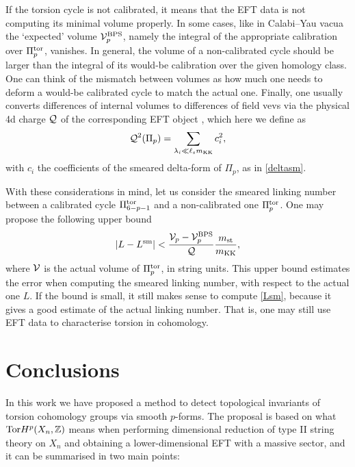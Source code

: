 \documentclass[11pt]{article}
\def\be{\begin{equation}}
\def\ee{\end{equation}}
\newcommand{\IZ}{\mathbb{Z}}
\begin{document}
If the torsion cycle is not calibrated, it means that the EFT data is not computing its minimal volume properly. In some cases, like in Calabi--Yau vacua the `expected' volume ${\cal V}_p^{\rm BPS}$, namely the integral of the appropriate calibration over $\Pi_p^{\rm tor}$,  vanishes. In general, the volume of a non-calibrated cycle should be larger than the integral of its would-be calibration over the given homology class. One can think of the mismatch between volumes as how much one needs to deform a would-be calibrated cycle to match the actual one. Finally, one usually converts differences of internal volumes to differences of field vevs via the physical 4d charge ${\cal Q}$ of the corresponding EFT object  \cite{Lanza:2021udy}, which here we define as 
\be
{\cal Q}^2(\Pi_p) = \sum_{\lambda_i \ll \ell_s m_{\rm KK}} c_i^2 ,
\label{physQ}
\ee
with $c_i$ the coefficients of the smeared delta-form of $\Pi_p$, as in \eqref{deltasm}.  

With these considerations in mind, let us consider the smeared linking number between a calibrated cycle $\Pi_{6-p-1}^{\rm tor}$ and a non-calibrated one $\Pi_p^{\rm tor}$. One may propose the following upper bound 
\be
\left| L- L^{\rm sm} \right| < \frac{{\cal V}
_p - {\cal V}_{p}^{\rm BPS}}{{\cal Q}} \frac{m_{\rm st}}{m_{\rm KK}} ,
\ee
where ${\cal V}$ is the actual volume of $\Pi_p^{\rm tor}$, in string units. This upper bound estimates the error when computing the smeared linking number, with respect to the actual one $L$. If the bound is small, it still makes sense to compute \eqref{Lsm}, because it gives a good estimate of the actual linking number. That is, one may still use EFT data to characterise torsion in cohomology.



\section{Conclusions}
\label{s:conclu}

In this work we have proposed a method to detect topological invariants of torsion cohomology groups via smooth $p$-forms. The proposal is based on what ${\rm Tor} H^p(X_n, \IZ)$ means when performing dimensional reduction of type II string theory on $X_n$ and obtaining a lower-dimensional EFT with a massive sector, and it can be summarised in two main points: 
\end{document}
